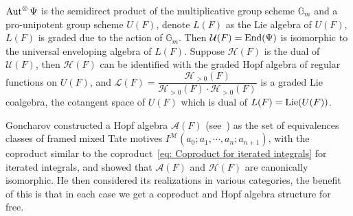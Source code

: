 $\operatorname{Aut}^{\otimes}\Psi$ is the semidirect product of the multiplicative group scheme $\mathbb G_m$ and a pro-unipotent group scheme $U(F)$, denote $L(F)$ as the Lie algebra of $U(F)$, $L(F)$ is graded due to the action of $\mathbb G_m$. Then $\mathcal U(F)=\operatorname{End}(\Psi)$ is isomorphic to the universal enveloping algebra of $L(F)$. Suppose $\mathcal H(F)$ is the dual of $\mathcal U(F)$, then $\mathcal H(F)$ can be identified with the graded Hopf algebra of regular functions on $U(F)$, and $\mathcal L(F)=\dfrac{\mathcal H_{>0}(F)}{\mathcal H_{>0}(F)\cdot\mathcal H_{>0}(F)}$ is a graded Lie coalgebra, the cotangent space of $U(F)$ which is dual of $L(F)=\operatorname{Lie}(U(F))$.

Goncharov constructed a Hopf algebra $\mathcal A(F)$ (see~\cite{Goncharov_GaloisSymmetriesOfFundamentalGroupoidsAndNoncommutativeGeometry}) as the set of equivalences classes of framed mixed Tate motives $I^{\mathcal M}(a_0;a_1,\cdots,a_n;a_{n+1})$, with the coproduct similar to the coproduct~\eqref{eq: Coproduct for iterated integrals} for iterated integrals, and showed that $\mathcal A(F)$ and $\mathcal H(F)$ are canonically isomorphic. He then considered its realizations in various categories, the benefit of this is that in each case we get a coproduct and Hopf algebra structure for free.